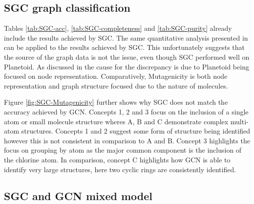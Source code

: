 \subsection{SGC graph classification}
\label{SGC-graph}

Tables \ref{tab:SGC-acc}, \ref{tab:SGC-completeness} and \ref{tab:SGC-purity} already include the results achieved by SGC.
The same quantitative analysis presented in  can be applied to the results achieved by SGC.
This unfortunately suggests that the source of the graph data is not the issue, even though SGC performed well on Planetoid\cite{Fey/Lenssen/2019}.
As discussed in  the cause for the discrepancy is due to Planetoid\cite{Fey/Lenssen/2019} being focused on node representation.
Comparatively, Mutagenicity is both node representation and graph structure focused due to the nature of molecules.

Figure \ref{fig:SGC-Mutagenicity} further shows why SGC does not match the accuracy achieved by GCN.
Concepts 1, 2 and 3 focus on the inclusion of a single atom or small molecule structure wheres A, B and C demonstrate complex multi-atom structures.
Concepts 1 and 2 suggest some form of structure being identified however this is not consistent in comparison to A and B.
Concept 3 highlights the focus on grouping by atom as the major common component is the inclusion of the chlorine atom.
In comparison, concept C highlights how GCN is able to identify very large structures, here two cyclic rings are consistently identified.

\subsection{SGC and GCN mixed model}
\label{sec:SGCN}



